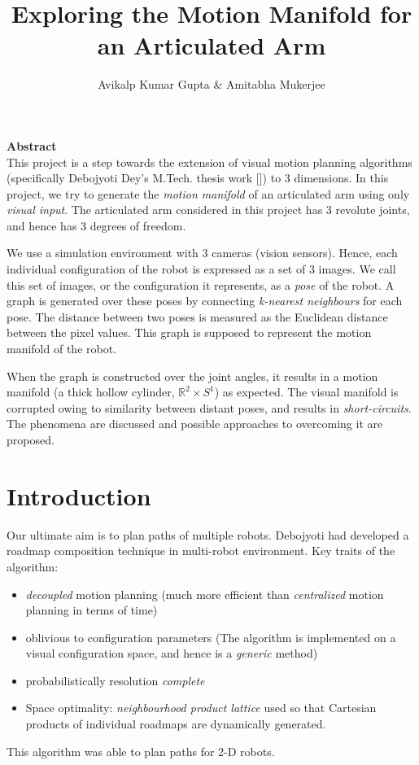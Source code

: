 \documentclass[12pt, two column]{article}
\title{Exploring the Motion Manifold for an Articulated Arm}
\author{ Avikalp Kumar Gupta \& Amitabha Mukerjee}
\begin{document}
\maketitle
 
\textbf{\large{Abstract}}\vspace{0.4em}\\
This project is a step towards the extension of visual motion planning algorithms (specifically Debojyoti Dey's M.Tech. thesis work [\cite{deb}]) to 3 dimensions. In this project, we try to generate the \textit{motion manifold} of an articulated arm using only \textit{visual input}. The articulated arm considered in this project has 3 revolute joints, and hence has 3 degrees of freedom.

We use a simulation environment with 3 cameras (vision sensors). Hence, each individual configuration of the robot is expressed as a set of 3 images. We call this set of images, or the configuration it represents, as a \textit{pose} of the robot. A graph is generated over these poses by connecting \textit{k-nearest neighbours} for each pose. The distance between two poses is measured as the Euclidean distance between the pixel values. This graph is supposed to represent the motion manifold of the robot. 

When the graph is constructed over the joint angles, it results in a motion
manifold (a thick hollow cylinder, $\mathbb{R}^2 \times S^1$) as expected.  The visual manifold is
corrupted owing to similarity between distant poses, and results in
\textit{short-circuits}.  The phenomena are discussed and possible approaches to
overcoming it are proposed. 

\section{Introduction}

Our ultimate aim is to plan paths of multiple robots.
Debojyoti had developed a roadmap composition technique in multi-robot environment. Key traits of the algorithm:
\begin{itemize}
  \setlength\itemsep{0em}
  \item \textit{decoupled} motion planning (much more efficient than \textit{centralized} motion planning in terms of time)
  \item oblivious to configuration parameters (The algorithm is implemented on a visual configuration space, and hence is a \textit{generic} method)
  \item probabilistically resolution \textit{complete}
  \item Space optimality: \textit{neighbourhood product lattice} used so that Cartesian products of individual roadmaps are dynamically generated.
\end{itemize}
This algorithm was able to plan paths for 2-D robots.
\end{document}
